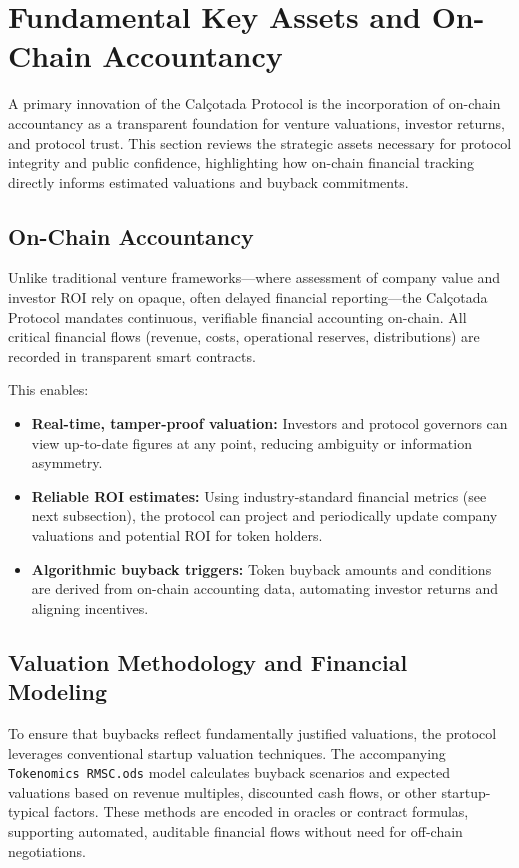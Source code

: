 \documentclass[conference]{IEEEtran}
\begin{document}
\section{Fundamental Key Assets and On-Chain Accountancy}
A primary innovation of the Calçotada Protocol is the incorporation of on-chain accountancy as a transparent foundation for venture valuations, investor returns, and protocol trust. This section reviews the strategic assets necessary for protocol integrity and public confidence, highlighting how on-chain financial tracking directly informs estimated valuations and buyback commitments.

\subsection{On-Chain Accountancy}
Unlike traditional venture frameworks—where assessment of company value and investor ROI rely on opaque, often delayed financial reporting—the Calçotada Protocol mandates continuous, verifiable financial accounting on-chain. All critical financial flows (revenue, costs, operational reserves, distributions) are recorded in transparent smart contracts.

This enables:
\begin{itemize}
    \item \textbf{Real-time, tamper-proof valuation:} Investors and protocol governors can view up-to-date figures at any point, reducing ambiguity or information asymmetry.
    \item \textbf{Reliable ROI estimates:} Using industry-standard financial metrics (see next subsection), the protocol can project and periodically update company valuations and potential ROI for token holders.
    \item \textbf{Algorithmic buyback triggers:} Token buyback amounts and conditions are derived from on-chain accounting data, automating investor returns and aligning incentives.
\end{itemize}

\subsection{Valuation Methodology and Financial Modeling}
To ensure that buybacks reflect fundamentally justified valuations, the protocol leverages conventional startup valuation techniques. The accompanying \texttt{Tokenomics RMSC.ods} model calculates buyback scenarios and expected valuations based on revenue multiples, discounted cash flows, or other startup-typical factors. These methods are encoded in oracles or contract formulas, supporting automated, auditable financial flows without need for off-chain negotiations.
\end{document}
